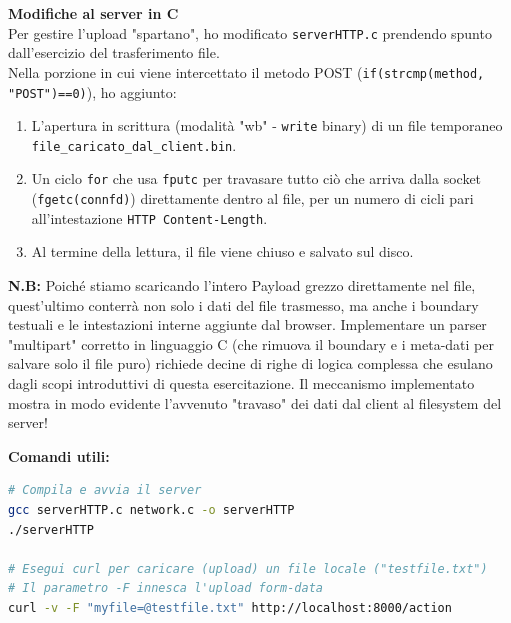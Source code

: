 \documentclass[11pt]{article}
\begin{document}
\begin{tcolorbox}[colback=green!5!white,colframe=green!75!black,title=\textbf{RISPOSTA}, breakable]
\textbf{Modifiche al server in C}\\
Per gestire l'upload "spartano", ho modificato \texttt{serverHTTP.c} prendendo spunto dall'esercizio del trasferimento file.\\
Nella porzione in cui viene intercettato il metodo POST (\texttt{if(strcmp(method, "POST")==0)}), ho aggiunto:
\begin{enumerate}
    \item L'apertura in scrittura (modalità "wb" - \texttt{write} binary) di un file temporaneo \texttt{file\_caricato\_dal\_client.bin}.
    \item Un ciclo \texttt{for} che usa \texttt{fputc} per travasare tutto ciò che arriva dalla socket (\texttt{fgetc(connfd)}) direttamente dentro al file, per un numero di cicli pari all'intestazione \texttt{HTTP Content-Length}.
    \item Al termine della lettura, il file viene chiuso e salvato sul disco.
\end{enumerate}

\textbf{N.B:} Poiché stiamo scaricando l'intero Payload grezzo direttamente nel file, quest'ultimo conterrà non solo i dati del file trasmesso, ma anche i boundary testuali e le intestazioni interne aggiunte dal browser. Implementare un parser "multipart" corretto in linguaggio C (che rimuova il boundary e i meta-dati per salvare solo il file puro) richiede decine di righe di logica complessa che esulano dagli scopi introduttivi di questa esercitazione. Il meccanismo implementato mostra in modo evidente l'avvenuto "travaso" dei dati dal client al filesystem del server!

\textbf{Comandi utili:}
\begin{lstlisting}[language=bash, basicstyle=\ttfamily\small]
# Compila e avvia il server
gcc serverHTTP.c network.c -o serverHTTP
./serverHTTP

# Esegui curl per caricare (upload) un file locale ("testfile.txt")
# Il parametro -F innesca l'upload form-data
curl -v -F "myfile=@testfile.txt" http://localhost:8000/action
\end{lstlisting}
\end{tcolorbox}
\end{document}
